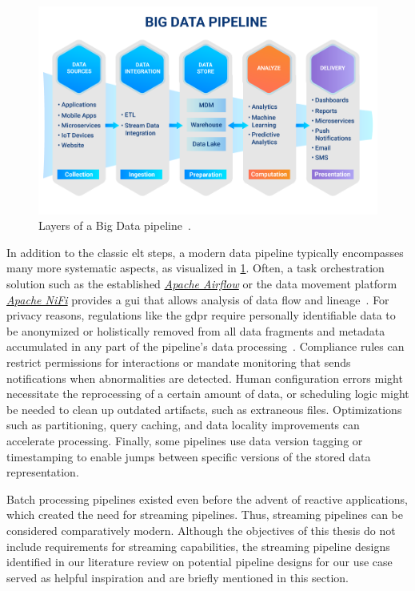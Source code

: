 \begin{figure}[H]
    \centering
    \includegraphics[width=\textwidth]{figures/pipeline.png}
    \caption{Layers of a Big Data pipeline~\cite{Davis2022}.}
    \label{fig:relatedwork-big-data-pipeline}
\end{figure}

In addition to the classic \ac{elt} steps, a modern data pipeline typically encompasses many more systematic aspects, as visualized in \cref{fig:relatedwork-big-data-pipeline}.
Often, a task orchestration solution such as the established \href{https://airflow.apache.org/}{\textit{Apache Airflow}} or the data movement platform \href{https://nifi.apache.org/}{\textit{Apache NiFi}} provides a \ac{gui} that allows analysis of data flow and lineage~\cite{Matskin2021, Faizan2021}.
For privacy reasons, regulations like the \ac{gdpr} require personally identifiable data to be anonymized or holistically removed from all data fragments and metadata accumulated in any part of the pipeline's data processing~\cite{Yu2016}.
Compliance rules can restrict permissions for interactions or mandate monitoring that sends notifications when abnormalities are detected.
Human configuration errors might necessitate the reprocessing of a certain amount of data, or scheduling logic might be needed to clean up outdated artifacts, such as extraneous files.
Optimizations such as partitioning, query caching, and data locality improvements can accelerate processing.
Finally, some pipelines use data version tagging or timestamping to enable jumps between specific versions of the stored data representation.

Batch processing pipelines existed even before the advent of reactive applications, which created the need for streaming pipelines.
Thus, streaming pipelines can be considered comparatively modern.
Although the objectives of this thesis do not include requirements for streaming capabilities, the streaming pipeline designs identified in our literature review on potential pipeline designs for our use case served as helpful inspiration and are briefly mentioned in this section.

